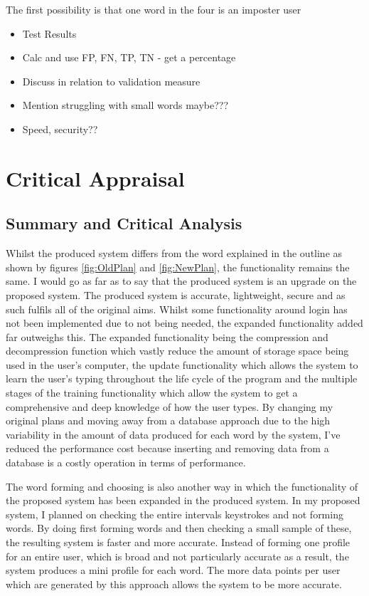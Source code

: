 \documentclass[10pt,a4paper]{report}
\begin{document}
The first possibility is that one word in the four is an imposter user




\begin{itemize}
	\item Test Results
	\item Calc and use FP, FN, TP, TN - get a percentage
	\item Discuss in relation to validation measure
	\item Mention struggling with small words maybe???
	\item Speed, security??
\end{itemize}


\chapter{Critical Appraisal}




\section{Summary and Critical Analysis}

 Whilst the produced system differs from the word explained in the outline as shown by figures \ref{fig:OldPlan} and \ref{fig:NewPlan}, the functionality remains the same. I would go as far as to say that the produced system is an upgrade on the proposed system. The produced system is accurate, lightweight, secure and as such fulfils all of the original aims. Whilst some functionality around login has not been implemented due to not being needed, the expanded functionality added far outweighs this. The expanded functionality being the compression and decompression function which vastly reduce the amount of storage space being used in the user's computer, the update functionality which allows the system to learn the user's typing throughout the life cycle of the program and the multiple stages of the training functionality which allow the system to get a comprehensive and deep knowledge of how the user types. By changing my original plans and moving away from a database approach due to the high variability in the amount of data produced for each word by the system, I've reduced the performance cost because inserting and removing data from a database is a costly operation in terms of performance.

The word forming and choosing is also another way in which the functionality of the proposed system has been expanded in the produced system. In my proposed system, I planned on checking the entire intervals keystrokes and not forming words. By doing first forming words and then checking a small sample of these, the resulting system is faster and more accurate. Instead of forming one profile for an entire user, which is broad and not particularly accurate as a result, the system produces a mini profile for each word. The more data points per user which are generated by this approach allows the system to be more accurate.
\end{document}
